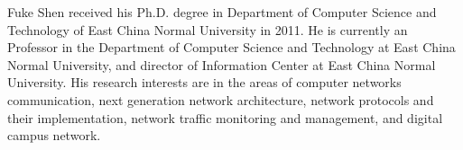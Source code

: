 \documentclass{ieeeaccess}
\theoremstyle{definition}
\begin{document}
\begin{IEEEbiography}{Fuke Shen}
    received his Ph.D. degree in Department of Computer Science and Technology of East China Normal University in 2011. He is currently an Professor in the Department of Computer Science and Technology at East China Normal University, and director of Information Center at East China Normal University. His research interests are in the areas of computer networks communication, next generation network architecture, network protocols and their implementation, network traffic monitoring and management, and digital campus network.
\end{IEEEbiography}

\EOD
\end{document}

